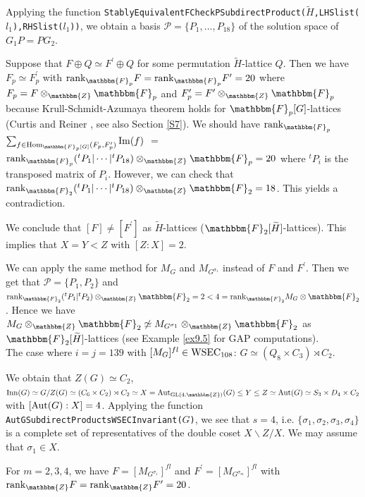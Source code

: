 \documentclass{amsart}
\theoremstyle{plain}
\theoremstyle{definition}
\theoremstyle{remark}
\newcommand{\bZ}{\mathbbm{Z}}\newcommand{\bQ}{\mathbbm{Q}}
\newcommand{\bF}{\mathbbm{F}}\newcommand{\bP}{\mathbbm{P}}
\newcommand{\GL}{{\rm GL}}\newcommand{\SL}{{\rm SL}}
\begin{document}
Applying the function 
{\tt StablyEquivalentFCheckPSubdirectProduct($\widetilde{H}$,LHSlist($l_1$),RHSlist($l_1$))}, 
we obtain a basis 
$\mathcal{P}=\{P_1,\dots,P_{18}\}$ of the solution space of $G_1P=PG_2$. 

Suppose that $F\oplus Q\simeq F^\prime\oplus Q$ for some permutation 
$\widetilde{H}$-lattice $Q$. 
Then we have $F_p\simeq F^\prime_p$ with 
${\rm rank}_{\bF_p} F={\rm rank}_{\bF_p} F^\prime=20$
where $F_p=F\otimes_\bZ \bF_p$ and $F^\prime_p=F^\prime\otimes_\bZ \bF_p$ 
because Krull-Schmidt-Azumaya theorem holds for $\bF_p[G]$-lattices 
(Curtis and Reiner \cite[Theorem 6.12]{CR81}, see also Section \ref{S7}). 
We should have 
${\rm rank}_{\bF_p}$ 
$\sum_{f\in {\rm Hom}_{\bF_p[G]}(F_p,F^\prime_p)}{\rm Im}(f)$ $=$ 
${\rm rank}_{\bF_p} ({}^tP_1|\cdots|{}^tP_{18})\otimes_\bZ \bF_p=20$ 
where ${}^tP_i$ is 
the transposed matrix of $P_i$. 
However, we can check that 
${\rm rank}_{\bF_2} ({}^tP_1|\cdots|{}^tP_{18})\otimes_\bZ \bF_2=18$. 
This yields a contradiction. 

We conclude that $[F]\neq [F^\prime]$ as $\widetilde{H}$-lattices 
($\bF_2[\widetilde{H}]$-lattices). 
This implies that $X=Y<Z$ with $[Z:X]=2$. 

We can apply the same method for $M_G$ and $M_{G^{\sigma_1}}$ 
instead of $F$ and $F^\prime$. 
Then we get that $\mathcal{P}=\{P_1,P_2\}$ and 
${\rm rank}_{\bF_2} ({}^tP_1|{}^tP_2)\otimes_\bZ \bF_2=2<4={\rm rank}_{\bF_2} M_G\otimes \bF_2$. 
Hence we have 
$M_G\otimes_\bZ \bF_2\not\simeq M_{G^{\sigma_1}}\otimes_\bZ \bF_2$ 
as $\bF_2[\widetilde{H}]$-lattices 
(see Example \ref{ex9.5} for GAP computations).\\

The case where $i=j=139$ with $[M_G]^{fl}\in {\rm WSEC}_{108}$: $G\simeq (Q_8\times C_3)\rtimes C_2$. 

We obtain that $Z(G)\simeq C_2$, 
${\rm Inn}(G)\simeq G/Z(G)\simeq (C_6\times C_2)\rtimes C_2\simeq 
X={\rm Aut}_{\GL(4,\bZ)}(G)\leq 
Y\leq Z\simeq {\rm Aut}(G)\simeq S_3\times D_4\times C_2$ 
with $[{\rm Aut}(G):X]=4$. 
Applying the function 
{\tt AutGSubdirectProductsWSECInvariant(}$G${\tt)}, 
we see that $s=4$, i.e. 
$\{\sigma_1,\sigma_2,\sigma_3,\sigma_4\}$ is a complete set 
of representatives of the double coset $X\backslash Z/X$. 
We may assume that $\sigma_1\in X$. 

For $m=2,3,4$, 
we have $F=[M_{G^{\sigma_1}}]^{fl}$ 
and $F^\prime=[M_{G^{\sigma_m}}]^{fl}$ 
with ${\rm rank}_\bZ F={\rm rank}_\bZ F^\prime=20$. 
\end{document}
